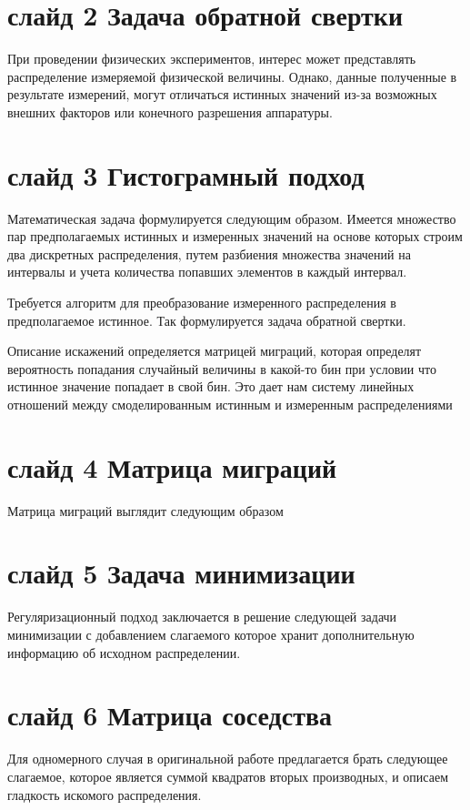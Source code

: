 \documentclass[a4paper,12pt]{diplom}
\begin{document}
\section*{слайд 2  Задача обратной свертки}


При проведении физических экспериментов, интерес может представлять распределение измеряемой физической величины. Однако, данные 
полученные в результате измерений, могут отличаться истинных значений из-за возможных внешних факторов или конечного разрешения 
аппаратуры. 

\section*{слайд 3 Гистограмный подход}
Математическая задача формулируется следующим образом. Имеется множество пар предполагаемых истинных и измеренных значений на основе которых 
строим два дискретных распределения, путем разбиения множества значений на интервалы и учета количества попавших элементов в каждый интервал.

Требуется алгоритм для преобразование измеренного распределения в предполагаемое истинное. Так формулируется задача обратной свертки.

Описание искажений определяется матрицей миграций, которая определят вероятность попадания случайный величины в какой-то бин
при условии что истинное значение попадает в свой бин. Это дает нам систему линейных отношений между смоделированным истинным и
измеренным распределениями

\section*{слайд 4 Матрица миграций}
Матрица миграций выглядит следующим образом


\section*{слайд 5 Задача минимизации}
Регуляризационный подход заключается в решение следующей задачи минимизации с добавлением слагаемого которое хранит дополнительную 
информацию об исходном распределении. 

\section*{слайд 6 Матрица соседства}
Для одномерного случая в оригинальной работе предлагается брать следующее слагаемое, которое является суммой квадратов вторых 
производных, и описаем гладкость искомого распределения.
\end{document}
